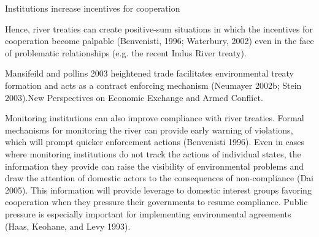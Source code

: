 	Institutions increase incentives for cooperation
	
	Hence, river treaties can create positive-sum situations in which the incentives for cooperation become palpable (Benvenisti, 1996; Waterbury, 2002)  even in the face of problematic relationships (e.g. the recent Indus River treaty).
	
	Mansifeild and pollins 2003 heightened trade facilitates environmental treaty formation and acts as a contract enforcing mechanism (Neumayer 2002b; Stein 2003).New Perspectives on Economic Exchange and Armed Conflict.
	
	Monitoring institutions can also improve compliance with river treaties. Formal mechanisms for monitoring the river can provide early warning of violations, which will prompt quicker enforcement actions (Benvenisti 1996). Even in cases where monitoring institutions do not track the actions of individual states, the information they provide can raise the visibility of environmental problems and draw the attention of domestic actors to the consequences of non-compliance (Dai 2005). This information will provide leverage to domestic interest groups favoring cooperation when they pressure their governments to resume compliance. Public pressure is especially important for implementing environmental agreements (Haas, Keohane, and Levy 1993).
	
	

